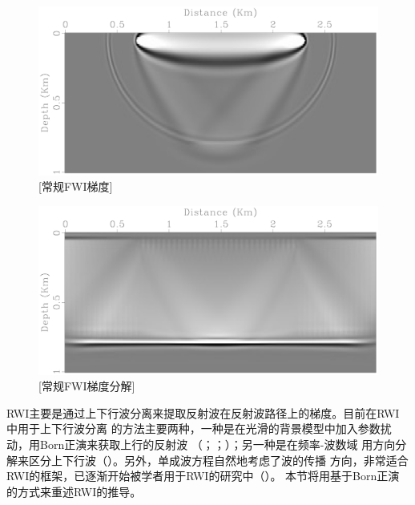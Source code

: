 \begin{figure}[!htbp]
	\centering
	\includegraphics[width=0.95\linewidth]{figure/grad_full}
	[常规FWI梯度]
	\label{fig:grad_full}
\end{figure}

\begin{figure}[!htbp]
	\centering
	\includegraphics[width=1.0\linewidth]{figure/grad}
	[常规FWI梯度分解]
	\label{fig:grad}
\end{figure}

RWI主要是通过上下行波分离来提取反射波在反射波路径上的梯度。目前在RWI中用于上下行波分离
的方法主要两种，一种是在光滑的背景模型中加入参数扰动，用Born正演来获取上行的反射波
（；；）；另一种是在频率-波数域
用方向分解来区分上下行波（）。另外，单成波方程自然地考虑了波的传播
方向，非常适合RWI的框架，已逐渐开始被学者用于RWI的研究中（）。
本节将用基于Born正演的方式来重述RWI的推导。

